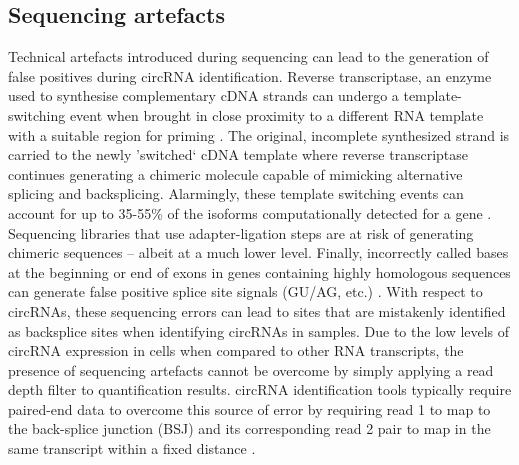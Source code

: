 \documentclass[pdflatex,sn-mathphys-num]{sn-jnl}
\begin{document}
\subsection{Sequencing artefacts}
Technical artefacts introduced during sequencing can lead to the generation of false positives during circRNA identification. Reverse transcriptase, an enzyme used to synthesise complementary cDNA strands can undergo a template-switching event when brought in close proximity to a different RNA template with a suitable region for priming \cite{Cocquet2006Jul}. The original, incomplete synthesized strand is carried to the newly 'switched` cDNA template where reverse transcriptase continues generating a chimeric molecule capable of mimicking alternative splicing and backsplicing. Alarmingly, these template switching events can account for up to 35-55\% of the isoforms computationally detected for a gene \cite{Roy2015}. Sequencing libraries that use adapter-ligation steps are at risk of generating chimeric sequences -- albeit at a much lower level. Finally, incorrectly called bases at the beginning or end of exons in genes containing highly homologous sequences can generate false positive splice site signals (GU/AG, etc.) \cite{Salzman2014Jun}. With respect to circRNAs, these sequencing errors can lead to sites that are mistakenly identified as backsplice sites when identifying circRNAs in samples. Due to the low levels of circRNA expression in cells when compared to other RNA transcripts, the presence of sequencing artefacts cannot be overcome by simply applying a read depth filter to quantification results. circRNA identification tools typically require paired-end data to overcome this source of error by requiring read 1 to map to the back-splice junction (BSJ) and its corresponding read 2 pair to map in the same transcript within a fixed distance \cite{Salzman2012}.
\end{document}
